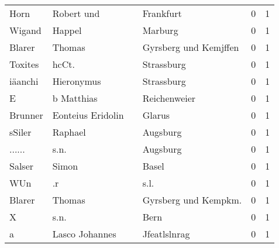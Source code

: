 \begin{center}
\begin{tiny}
\begin{longtabu}{llllrr}
                     Horn &                         Robert und &             &                                   Frankfurt &          0 &         1 \\
                   Wigand &                             Happel &             &                                     Marburg &          0 &         1 \\
                   Blarer &                             Thomas &             &                       Gyrsberg und Kemjffen &          0 &         1 \\
                  Toxites &                              hcCt. &             &                                  Strassburg &          0 &         1 \\
                  iäanchi &                         Hieronymus &             &                                  Strassburg &          0 &         1 \\
                        E &                         b Matthias &             &                                Reichenweier &          0 &         1 \\
                  Brunner &                  Eonteius Eridolin &             &                                      Glarus &          0 &         1 \\
                   sSiler &                            Raphael &             &                                    Augsburg &          0 &         1 \\
                   ...... &                               s.n. &             &                                    Augsburg &          0 &         1 \\
                   Salser &                              Simon &             &                                       Basel &          0 &         1 \\
                      WUn &                                 .r &             &                                        s.l. &          0 &         1 \\
                   Blarer &                             Thomas &             &                       Gyrsberg und Kempkm.  &          0 &         1 \\
                        X &                               s.n. &             &                                        Bern &          0 &         1 \\
                        a &                     Lasco Johannes &             &                                Jfeatlslnrag &          0 &         1 \\

\end{longtabu}
\end{tiny}
\end{center}
